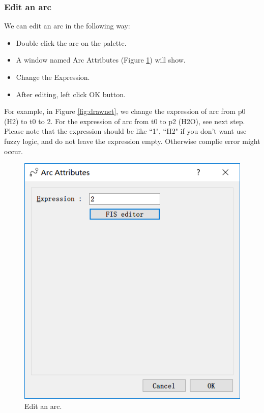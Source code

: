 \documentclass[journal,a4paper,onecolumn]{article}
\begin{document}
\subsubsection{Edit an arc}
We can edit an arc in the following way:
\begin{itemize}
	\item Double click the arc on the palette.
	\item A window named Arc Attributes (Figure \ref{fig:editarc}) will show.
	\item Change the Expression.
	\item After editing, left click OK button.
\end{itemize}

For example, in Figure \ref{fig:drawnet}, we change the expression of arc from p0 (H2) to t0 to 2. For the expression of arc from t0 to p2 (H2O), see next step. Please note that the expression should be like ``1", ``H2" if you don't want use fuzzy logic, and do not leave the expression empty. Otherwise complie error might occur. 

\begin{figure}[!hbt]
	\begin{center}
		\includegraphics[width=\columnwidth]{fig5}
		\caption{Edit an arc.}
		\label{fig:editarc}
	\end{center}
\end{figure}
\end{document}
